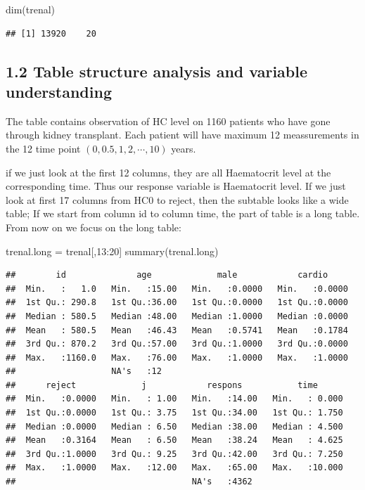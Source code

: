 \documentclass[
]{article}
\newenvironment{Shaded}{\begin{snugshade}}{\end{snugshade}}
\newcommand{\DecValTok}[1]{\textcolor[rgb]{0.00,0.00,0.81}{#1}}
\newcommand{\FunctionTok}[1]{\textcolor[rgb]{0.00,0.00,0.00}{#1}}
\newcommand{\NormalTok}[1]{#1}
\newcommand{\OtherTok}[1]{\textcolor[rgb]{0.56,0.35,0.01}{#1}}
\newcommand{\SpecialCharTok}[1]{\textcolor[rgb]{0.00,0.00,0.00}{#1}}
\begin{document}
\begin{Shaded}
\begin{Highlighting}[]
\FunctionTok{dim}\NormalTok{(trenal)}
\end{Highlighting}
\end{Shaded}

\begin{verbatim}
## [1] 13920    20
\end{verbatim}

\hypertarget{table-structure-analysis-and-variable-understanding}{%
\subsection{1.2 Table structure analysis and variable
understanding}\label{table-structure-analysis-and-variable-understanding}}

The table contains observation of HC level on 1160 patients who have
gone through kidney transplant. Each patient will have maximum 12
meassurements in the 12 time point \((0,0.5,1,2,\cdots,10)\) years.

if we just look at the first 12 columns, they are all Haematocrit level
at the corresponding time. Thus our response variable is Haematocrit
level. If we just look at first 17 columns from HC0 to reject, then the
subtable looks like a wide table; If we start from column id to column
time, the part of table is a long table. From now on we focus on the
long table:

\begin{Shaded}
\begin{Highlighting}[]
\NormalTok{trenal.long }\OtherTok{=}\NormalTok{ trenal[,}\DecValTok{13}\SpecialCharTok{:}\DecValTok{20}\NormalTok{]}
\FunctionTok{summary}\NormalTok{(trenal.long)}
\end{Highlighting}
\end{Shaded}

\begin{verbatim}
##        id              age             male            cardio      
##  Min.   :   1.0   Min.   :15.00   Min.   :0.0000   Min.   :0.0000  
##  1st Qu.: 290.8   1st Qu.:36.00   1st Qu.:0.0000   1st Qu.:0.0000  
##  Median : 580.5   Median :48.00   Median :1.0000   Median :0.0000  
##  Mean   : 580.5   Mean   :46.43   Mean   :0.5741   Mean   :0.1784  
##  3rd Qu.: 870.2   3rd Qu.:57.00   3rd Qu.:1.0000   3rd Qu.:0.0000  
##  Max.   :1160.0   Max.   :76.00   Max.   :1.0000   Max.   :1.0000  
##                   NA's   :12                                       
##      reject             j            respons           time       
##  Min.   :0.0000   Min.   : 1.00   Min.   :14.00   Min.   : 0.000  
##  1st Qu.:0.0000   1st Qu.: 3.75   1st Qu.:34.00   1st Qu.: 1.750  
##  Median :0.0000   Median : 6.50   Median :38.00   Median : 4.500  
##  Mean   :0.3164   Mean   : 6.50   Mean   :38.24   Mean   : 4.625  
##  3rd Qu.:1.0000   3rd Qu.: 9.25   3rd Qu.:42.00   3rd Qu.: 7.250  
##  Max.   :1.0000   Max.   :12.00   Max.   :65.00   Max.   :10.000  
##                                   NA's   :4362
\end{verbatim}
\end{document}
